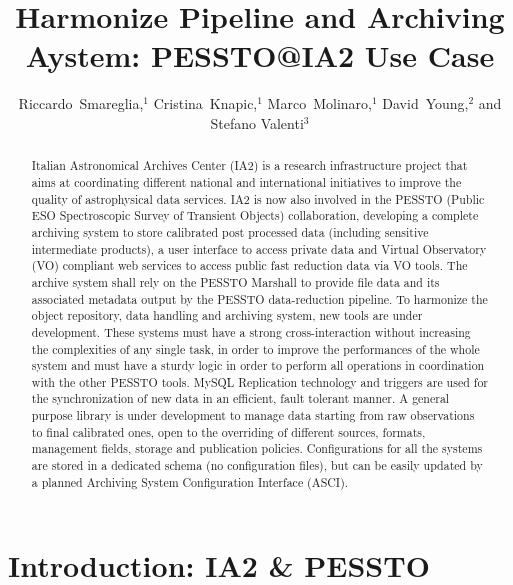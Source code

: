 
\resetcounters




\title{Harmonize Pipeline and Archiving Aystem: PESSTO@IA2 Use Case}
\author{Riccardo~Smareglia,$^1$ Cristina~Knapic,$^1$ Marco~Molinaro,$^1$ David~Young,$^2$ and Stefano Valenti$^3$
}


\begin{abstract}
Italian Astronomical Archives Center (IA2) is a research infrastructure project that aims at coordinating different national and international initiatives to improve the quality of astrophysical data services. IA2 is now also involved in the PESSTO (Public ESO Spectroscopic Survey of Transient Objects) collaboration, developing a complete archiving system to store calibrated post processed data (including sensitive intermediate products), a user interface to access private data and Virtual Observatory (VO) compliant web services to access public fast reduction data via VO tools. The archive system shall rely on the PESSTO Marshall to provide file data and its associated metadata output by the PESSTO data-reduction pipeline. To harmonize the object repository, data handling and archiving system, new tools are under development. These systems must have a strong cross-interaction without increasing the complexities of any single task, in order to improve the performances of the whole system and must have a sturdy logic in order to perform all operations in coordination with the other PESSTO tools. MySQL Replication technology and triggers are used for the synchronization of new data in an efficient, fault tolerant manner. A general purpose library is under development to manage data starting from raw observations to final calibrated ones, open to the overriding of different sources, formats, management fields, storage and publication policies. Configurations for all the systems are stored in a dedicated schema (no configuration files), but can be easily updated by a planned Archiving System Configuration Interface (ASCI). 
\end{abstract}

\section{Introduction: IA2 \& PESSTO}

